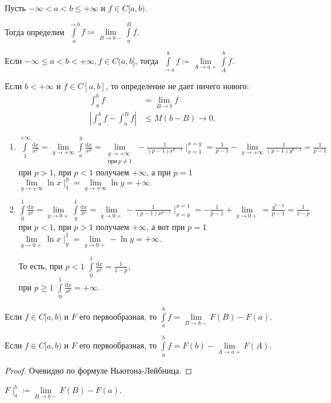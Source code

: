 \begin{definition}
    Пусть $-\infty < a < b \le +\infty$ и $f \in C[a, b)$.

    Тогда определим  $\int\limits_a^{\to b} f\coloneqq \lim\limits_{B \to b-} \int\limits_a^B f$.

    Если $-\infty \le a < b < +\infty, f \in C(a, b]$, тогда $\int\limits_{\to a}^b f \coloneqq \lim\limits_{A \to a+} \int\limits_A^b f$.
\end{definition}
\begin{remark}
    Если $b < +\infty$ и  $f \in C[a, b]$, то определение не дает ничего нового:  \begin{align*}
        \int_a^b f &= \lim_{B \to b}f \\
        \left|\int_a^b f - \int_a^B f\right| &\le M(b-B) \to 0
    .\end{align*}
\end{remark}
\begin{example}
    \begin{enumerate}
        \item $\int\limits_1^{+\infty} \frac{\mathrm{d}x}{x^p} = \lim\limits_{y \to +\infty} \int\limits_a^y \frac{\mathrm{d}x}{x^p} = \lim\limits_{\substack{y \to +\infty \\ \text{при}\ p \neq 1}} -\frac{1}{(p-1)x^{p-1}}\mid_{x=1}^{x=y} = \frac{1}{p-1} - \lim\limits_{y \to +\infty} \frac{1}{(p-1)y^{p-1}} = \frac{1}{p-1}$ при $p > 1$, при $p < 1$ получаем $+\infty$, а при $p = 1$  $\lim\limits_{y \to +\infty} \ln x \mid_1^y = \lim\limits_{y \to +\infty} \ln y = +\infty$
        \item $\int\limits_0^1 \frac{\mathrm{d}x}{x^p} = \lim\limits_{y \to 0+} \int\limits_y^1 \frac{\mathrm{d}x}{x^p} = \lim \limits_{y \to 0+} -\frac{1}{(p-1)x^{p-1}} \mid_{x=y}^{x=1} = -\frac{1}{p - 1} + \lim\limits_{y \to 0+} = \frac{y^{1-p}}{p - 1} = \frac{1}{1 - p}$ при $p < 1$, при  $p > 1$ получаем  $+\infty$, а вот при  $p = 1$  $\lim\limits_{y \to 0+} \ln x \mid_y^1 = \lim\limits_{y \to 0+} - \ln y = +\infty$.

            То есть, при  $p < 1$  $\int\limits_0^1 \frac{\mathrm{d}x}{x^p} = \frac{1}{1 - p}$, \\
            при $p \ge 1$ $\int\limits_0^1 \frac{\mathrm{d}x}{x^p} = +\infty$.
    \end{enumerate}
\end{example}
\begin{remark}
    Если $f \in C[a, b)$ и  $F$ его первообразная, то  $\int\limits_a^b f = \lim\limits_{B \to b-}F(B) - F(a)$.

    Если $f \in C[a, b)$ и  $F$ его первообразная, то  $\int\limits_a^b f = F(b) - \lim\limits_{A \to a+}F(A)$.
\end{remark}
\begin{proof}
    Очевидно по формуле Ньютона-Лейбница.
\end{proof}
\begin{definition}
    $F \mid_a^b \coloneqq \lim\limits_{B \to b-} F(B) - F(a)$.
\end{definition}


